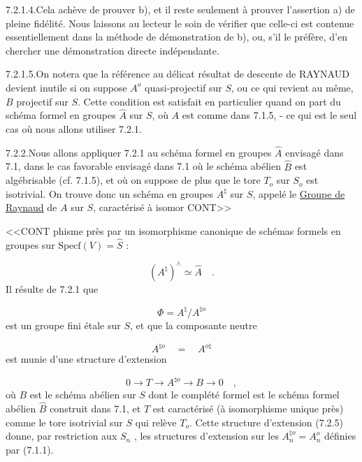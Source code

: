 7.2.1.4.\quad Cela achève de prouver b), et il reste seulement à prouver l'assertion a) de pleine fidélité. Nous laissons au lecteur le soin de vérifier que celle-ci est contenue essentiellement dans la méthode de démonstration de b), ou, s'il le préfère, d'en chercher une démonstration directe indépendante.

7.2.1.5.\quad On notera que la référence au délicat résultat de descente de RAYNAUD devient inutile si on suppose $A^{o}$ quasi-projectif sur $S$, ou ce qui revient au même, $B$ projectif sur $S$. Cette condition est satisfait en particulier quand on part du schéma formel en groupes $\hat{A}$ sur $S$, où $A$ est comme dans 7.1.5, - ce qui est le seul cas où nous allons utiliser 7.2.1.

7.2.2.\quad Nous allons appliquer 7.2.1 au schéma formel en groupes $\hat{A}$ envisagé dans 7.1, dans le cas favorable envisagé dans 7.1 où le schéma abélien $\hat{B}$ est algébrisable (cf. 7.1.5), et où on suppose de plus que le tore $T_{o}$ sur $S_{o}$ est isotrivial. On trouve donc un schéma en groupes $A^{\natural}$ sur $S$, appelé le \underline{Groupe de Raynaud} de $A$ sur $S$, caractérisé à isomor CONT>>



<<CONT phisme près par un isomorphisme canonique de schémas formels en groupes sur $\mathrm{Specf}(V) = \hat{S}$ :

\begin{equation}\tag{7.2.3}
(A^{\natural})^{\wedge} \simeq \hat{A} \quad .
\end{equation}
Il résulte de 7.2.1 que

\begin{equation}\tag{7.2.4}
\Phi = A^{\natural}/A^{\natural o}
\end{equation}
est un groupe fini étale sur $S$, et que la composante neutre

\begin{equation*}
A^{\natural o} \quad = \quad A^{o\natural}
\end{equation*}
est munie d'une structure d'extension

\begin{equation}\tag{7.2.5}
0 \longrightarrow T \longrightarrow A^{\natural o} \longrightarrow B \longrightarrow 0 \quad ,
\end{equation}
où $B$ est le schéma abélien sur $S$ dont le complété formel est le schéma formel abélien $\hat{B}$ construit dans 7.1, et $T$ est caractérisé (à isomorphisme unique près) comme le tore isotrivial sur $S$ qui relève $T_{o}$. Cette structure d'extension (7.2.5) donne, par restriction aux $S_{n}$ , les structures d'extension sur les $A_{n}^{\natural o} = A_{n}^{o}$ définies par (7.1.1).

